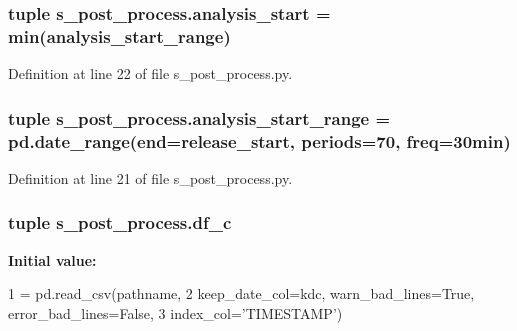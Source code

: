 \hypertarget{namespaces__post__process_a47acdf72893f9a03b4829dcaeed5bbb7}{}
\subsubsection[{analysis\+\_\+start}]{\setlength{\rightskip}{0pt plus 5cm}tuple s\+\_\+post\+\_\+process.\+analysis\+\_\+start = min({\bf analysis\+\_\+start\+\_\+range})}\label{namespaces__post__process_a47acdf72893f9a03b4829dcaeed5bbb7}


Definition at line 22 of file s\+\_\+post\+\_\+process.\+py.

\hypertarget{namespaces__post__process_a651eea1bf0f6d80a22819e1f99c7d72e}{}
\subsubsection[{analysis\+\_\+start\+\_\+range}]{\setlength{\rightskip}{0pt plus 5cm}tuple s\+\_\+post\+\_\+process.\+analysis\+\_\+start\+\_\+range = pd.\+date\+\_\+range(end={\bf release\+\_\+start}, periods=70, freq=\textquotesingle{}30min\textquotesingle{})}\label{namespaces__post__process_a651eea1bf0f6d80a22819e1f99c7d72e}


Definition at line 21 of file s\+\_\+post\+\_\+process.\+py.

\hypertarget{namespaces__post__process_addd6baa1416f79361bce8b4fbe5deb58}{}
\subsubsection[{df\+\_\+c}]{\setlength{\rightskip}{0pt plus 5cm}tuple s\+\_\+post\+\_\+process.\+df\+\_\+c}\label{namespaces__post__process_addd6baa1416f79361bce8b4fbe5deb58}
{\bfseries Initial value\+:}
\begin{DoxyCode}
1 = pd.read\_csv(pathname,
2                        keep\_date\_col=kdc, warn\_bad\_lines=\textcolor{keyword}{True}, error\_bad\_lines=\textcolor{keyword}{False},
3                        index\_col=\textcolor{stringliteral}{'TIMESTAMP'})
\end{DoxyCode}


